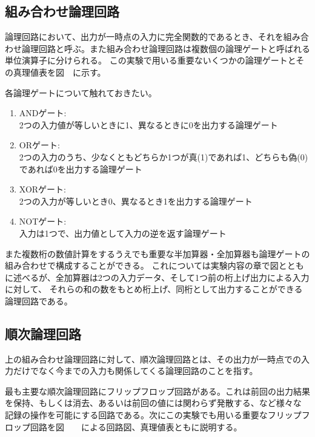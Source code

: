 \documentclass[11pt,a4j]{jsarticle}
\begin{document}
  \subsection{組み合わせ論理回路}
  論理回路において、出力が一時点の入力に完全関数的であるとき、それを組み合わせ論理回路と呼ぶ。また組み合わせ論理回路は複数個の論理ゲートと呼ばれる単位演算子に分けられる。
  この実験で用いる重要ないくつかの論理ゲートとその真理値表を図\ \ に示す。
  
  \newpage
  
  各論理ゲートについて触れておきたい。
  \begin{enumerate}
   \item ANDゲート: \\
   2つの入力値が等しいときに1、異なるときに0を出力する論理ゲート \\
   \item ORゲート: \\
   2つの入力のうち、少なくともどちらか1つが真(1)であれば1、どちらも偽(0)であれば0を出力する論理ゲート \\
   \item XORゲート: \\
   2つの入力が等しいとき0、異なるとき1を出力する論理ゲート \\
   \item NOTゲート: \\
   入力は1つで、出力値として入力の逆を返す論理ゲート \\
  \end{enumerate}
  
  
  また複数桁の数値計算をするうえでも重要な半加算器・全加算器も論理ゲートの組み合わせで構成することができる。
  これについては実験内容の章で図とともに述べるが、全加算器は2つの入力データ、そして1つ前の桁上げ出力による入力に対して、
  それらの和の数をもとめ桁上げ、同桁として出力することができる論理回路である。
  
  \subsection{順次論理回路}
  上の組み合わせ論理回路に対して、順次論理回路とは、その出力が一時点での入力だけでなく今までの入力も関係してくる論理回路のことを指す。
  
  最も主要な順次論理回路にフリップフロップ回路がある。これは前回の出力結果を保持、もしくは消去、あるいは前回の値には関わらず発散する、など様々な
  記録の操作を可能にする回路である。次にこの実験でも用いる重要なフリップフロップ回路を図\ \ \ \ による回路図、真理値表ともに説明する。
  
\end{document}
